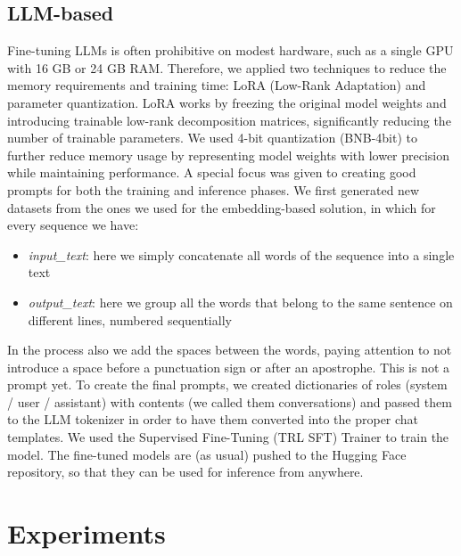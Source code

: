 \documentclass[11pt]{article}
\begin{document}
\subsection{LLM-based}
Fine-tuning LLMs is often prohibitive on modest hardware, such as a single GPU with 16 GB or 24 GB RAM. Therefore, we applied two techniques to reduce the memory requirements and training time: LoRA (Low-Rank Adaptation) and parameter quantization. \newline LoRA works by freezing the original model weights and introducing trainable low-rank decomposition matrices, significantly reducing the number of trainable parameters. We used 4-bit quantization (BNB-4bit) to further reduce memory usage by representing model weights with lower precision while maintaining performance. \newline A special focus was given to creating good prompts for both the training and inference phases. \newline We first generated new datasets from the ones we used for the embedding-based solution, in which for every sequence we have:
 \begin{itemize}
 	\item \emph{input\_text}: here we simply concatenate all words of the sequence into a single text
 	\item \emph{output\_text}: here we group all the words that belong to the same sentence on different lines, numbered sequentially
 \end{itemize}
 In the process also we add the spaces between the words, paying attention to
 not introduce a space before a punctuation sign or after an apostrophe. \newline This is not a prompt yet. To create the final prompts, we created dictionaries of roles (system / user / assistant) with contents (we called them conversations) and passed them to the LLM tokenizer in order to have them converted into the proper chat templates. \newline We used the Supervised Fine-Tuning (TRL SFT) Trainer to train the model. \newline The fine-tuned models are (as usual) pushed to the Hugging Face repository, so that they can be used for inference from anywhere.

\section{Experiments}
\end{document}
